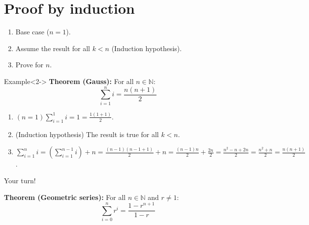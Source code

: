 \documentclass[11pt,a4paper,xcolor=dvipsnames, leqno]{beamer}
\begin{document}
\section{Proof by induction}
\begin{frame}
\begin{enumerate}
\item Base case ($n=1$).
\item Assume the result for all $k< n$ (Induction hypothesis).
\item Prove for $n$.
\end{enumerate}
\begin{alertblock}{Example}<2->
\textbf{Theorem (Gauss):} For all $n\in\mathbb{N}$:
\begin{equation*}
\sum\limits_{i = 1}^n i = \frac{n(n+1)}{2}
\end{equation*}
\begin{enumerate}
\item<3-> $(n=1) \sum\limits_{i = 1}^1 i = 1 = \frac{1(1+1)}{2}$.
\item<4-> (Induction hypothesis) The result is true for all $k<n$.
\item<5-> $\sum\limits_{i = 1}^n i = \left( \sum\limits_{i = 1}^{n-1} i \right)+ n = \frac{(n-1)(n-1 + 1)}{2}+ n = \frac{(n-1)n}{2}+ \frac{2n}{2} = \frac{n^2 -n + 2n}{2} = \frac{n^2 + n}{2} = \frac{n(n+1)}{2}$.
\end{enumerate}
\end{alertblock}
\end{frame}
\begin{frame}{Your turn!}
\begin{block}{}
\textbf{Theorem (Geometric series):} For all $n\in\mathbb{N}$ and $r\neq 1$:
\begin{equation*}
\sum\limits_{i = 0}^n r^i = \frac{1 - r^{n+1}}{1 - r}
\end{equation*}
\end{block}
\end{frame}
\end{document}
